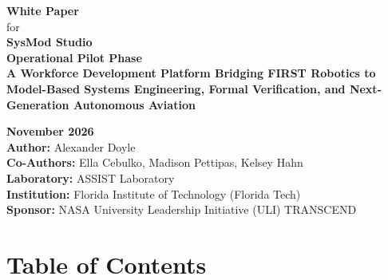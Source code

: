 \documentclass[11pt,letterpaper]{article}
\begin{document}
\begin{titlepage}
    \centering
    \vspace*{0.8cm}

    {\Huge \bfseries {White Paper}} \\[0.5em]
    {\large for} \\[0.8em]
    {\Huge \bfseries {SysMod Studio}} \\[0.8em]
    {\Large \textbf{Operational Pilot Phase}} \\[1.2em]
    {\large \textbf{A Workforce Development Platform Bridging FIRST Robotics to Model-Based Systems Engineering, Formal Verification, and Next-Generation Autonomous Aviation}} \\[2.2cm]

    \vfill

    {\large \textbf{November 2026}} \\[1em]
    {\large \textbf{Author:} Alexander Doyle} \\[0.4em]
    {\large \textbf{Co-Authors:} Ella Cebulko, Madison Pettipas, Kelsey Hahn} \\[0.4em]

    {\large \textbf{Laboratory:} ASSIST Laboratory} \\[0.4em]
    {\large \textbf{Institution:} Florida Institute of Technology (Florida Tech)} \\[0.4em]
    {\large \textbf{Sponsor:} NASA University Leadership Initiative (ULI) TRANSCEND} \\[2cm]

\end{titlepage}

\newpage
{}

\section*{\Huge {Table of Contents}}
\vspace{1.5em}
\end{document}
